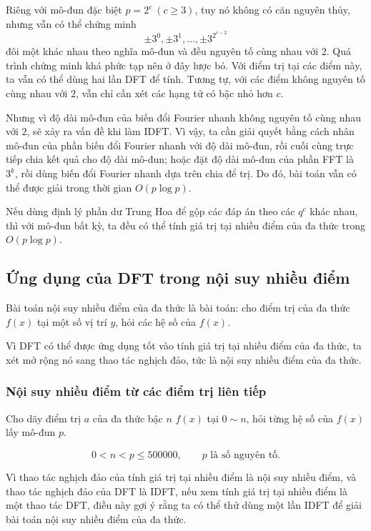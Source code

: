 \documentclass[11pt]{article}
\begin{document}
Riêng với mô-đun đặc biệt \(p=2^c\ (c\ge 3)\), tuy nó không có căn nguyên thủy,
nhưng vẫn có thể chứng minh
\[
\pm 3^0,\pm 3^1,\ldots,\pm 3^{2^{c-2}}
\]
đôi một khác nhau theo nghĩa mô-đun và đều nguyên tố cùng nhau với \(2\). Quá
trình chứng minh khá phức tạp nên ở đây lược bỏ. Với điểm trị tại các điểm này,
ta vẫn có thể dùng hai lần DFT để tính. Tương tự, với các điểm không nguyên tố
cùng nhau với \(2\), vẫn chỉ cần xét các hạng tử có bậc nhỏ hơn \(c\).

Nhưng vì độ dài mô-đun của biến đổi Fourier nhanh không nguyên tố cùng nhau với
\(2\), sẽ xảy ra vấn đề khi làm IDFT. Vì vậy, ta cần giải quyết bằng cách nhân
mô-đun của phần biến đổi Fourier nhanh với độ dài mô-đun, rồi cuối cùng trực
tiếp chia kết quả cho độ dài mô-đun; hoặc đặt độ dài mô-đun của phần FFT là
\(3^k\), rồi dùng biến đổi Fourier nhanh dựa trên chia để trị. Do đó, bài toán
vẫn có thể được giải trong thời gian \(O(p\log p)\).

Nếu dùng định lý phần dư Trung Hoa để gộp các đáp án theo các \(q^c\) khác
nhau, thì với mô-đun bất kỳ, ta đều có thể tính giá trị tại nhiều điểm của đa
thức trong \(O(p\log p)\).

\subsection{Ứng dụng của DFT trong nội suy nhiều điểm}

Bài toán nội suy nhiều điểm của đa thức là bài toán: cho điểm trị của đa thức
\(f(x)\) tại một số vị trí \(y\), hỏi các hệ số của \(f(x)\).

Vì DFT có thể được ứng dụng tốt vào tính giá trị tại nhiều điểm của đa thức, ta
xét mở rộng nó sang thao tác nghịch đảo, tức là nội suy nhiều điểm của đa thức.

\subsubsection{Nội suy nhiều điểm từ các điểm trị liên tiếp}

 Cho dãy điểm trị \(a\) của đa thức bậc \(n\) \(f(x)\) tại
\(0\sim n\), hỏi từng hệ số của \(f(x)\) lấy mô-đun \(p\).

\[
0<n<p\le 500000,\qquad p \text{ là số nguyên tố.}
\]

 Vì thao tác nghịch đảo của tính giá trị tại nhiều điểm là
nội suy nhiều điểm, và thao tác nghịch đảo của DFT là IDFT, nếu xem tính giá
trị tại nhiều điểm là một thao tác DFT, điều này gợi ý rằng ta có thể thử dùng
một lần IDFT để giải bài toán nội suy nhiều điểm của đa thức.
\end{document}
